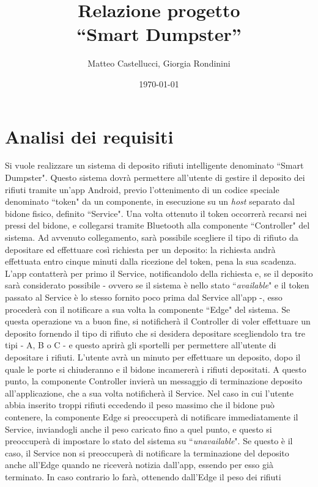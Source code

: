 \documentclass[a4paper, 12pt]{report}
\title{Relazione progetto\\``Smart Dumpster''}
\author{Matteo Castellucci, Giorgia Rondinini}
\date{\today}
\begin{document}
	\maketitle
	\tableofcontents
	\chapter{Analisi dei requisiti}
	Si vuole realizzare un sistema di deposito rifiuti intelligente denominato ``Smart Dumpster".\newline
	Questo sistema dovrà permettere all'utente di gestire il deposito dei rifiuti tramite un'app Android,
	previo l'ottenimento di un codice speciale denominato ``token" da un componente, in esecuzione su un
	\textit{host} separato dal bidone fisico, definito ``Service". Una volta ottenuto il token occorrerà
	recarsi nei pressi del bidone, e collegarsi tramite Bluetooth alla componente ``Controller" del
	sistema. Ad avvenuto collegamento, sarà possibile scegliere il tipo di rifiuto da depositare ed
	effettuare così richiesta per un deposito: la richiesta andrà effettuata entro cinque minuti dalla ricezione 
	del token, pena la sua scadenza. L'app contatterà per primo il Service, notificandolo della
	richiesta e, se il deposito sarà considerato possibile - ovvero se il sistema è nello stato ``\textit{available}"
	e il token passato al Service è lo stesso fornito poco prima dal Service all'app -, esso procederà
	con il notificare a sua volta la componente ``Edge" del sistema. Se questa operazione va a buon fine, 
	si notificherà il Controller di voler effettuare un deposito fornendo il tipo di rifiuto che si
	desidera depositare scegliendolo tra tre tipi - A, B o C - e questo aprirà gli sportelli per permettere
	all'utente di depositare i rifiuti. L'utente
	avrà un minuto per effettuare un deposito, dopo il quale le porte si chiuderanno e il bidone
	incamererà i rifiuti depositati. A questo punto, la componente Controller invierà un messaggio di
	terminazione deposito all'applicazione, che a sua volta notificherà il Service. Nel caso in cui
	l'utente abbia inserito troppi rifiuti eccedendo il peso massimo che il bidone può contenere, la
	componente Edge si preoccuperà di notificare immediatamente il Service, inviandogli anche il peso caricato fino a
	quel punto, e questo si preoccuperà di impostare lo stato del sistema su ``\textit{unavailable}". Se questo è
	il caso, il Service non si preoccuperà di notificare la terminazione del deposito anche all'Edge 
	quando ne riceverà notizia dall'app,
	essendo per esso già terminato. In caso contrario lo farà, ottenendo dall'Edge il peso dei rifiuti
\end{document}
